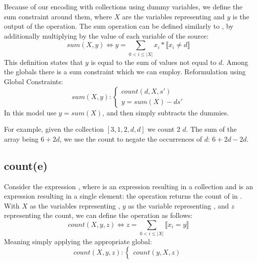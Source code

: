 Because of our encoding with collections using dummy variables, we define the sum constraint around them, where $X$ are the variables representing  and $y$ is the output of the  operation.
The sum operation can be defined similarly to , by additionally multiplying by the value of each variable of the source:  
\begin{equation}\label{def:sum}
    sum(X,y) \iff y = \sum_{0 < i \leq |X|} x_i * \llbracket x_i \neq d \rrbracket
\end{equation}
This definition states that $y$ is equal to the sum of values not equal to $d$.
Among the globals there is a sum constraint which we can employ.
Reformulation using Global Constraints:
\begin{equation}\label{csp:sum}
    sum(X,y):
    \begin{cases}
        count(d,X,s') \\
        y = sum(X) - ds'
    \end{cases}
\end{equation}
In this model use $y=sum(X)$, and then simply subtracts the dummies.

For example, given the collection $[3,1,2,d,d]$ we count 2 $d$.
The sum of the array being $6+2d$, we use the count to negate the occurrences of $d$:
$6+2d-2d$.

\subsection{count(e)}
Consider the expression , where  is an expression resulting in a collection and  is an expression resulting in a single element: the  operation returns the count of  in .
With $X$ as the variables representing , $y$ as the variable representing , and $z$ representing the count, we can define the operation as follows:
\begin{equation}\label{def:count}
    count(X,y,z) \iff z = \sum_{0 < i \leq |X|} \llbracket x_i = y \rrbracket
\end{equation}
Meaning simply applying the appropriate global:
\begin{equation}\label{csp:count}
    count(X,y,z):
    \begin{cases}
        count(y,X,z)
    \end{cases}
\end{equation}

